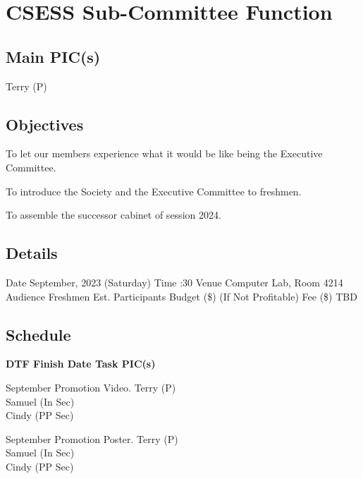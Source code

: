 \section{CSESS Sub-Committee Function}

\subsection{Main PIC(s)}
Terry (P)

\subsection{Objectives}
\startitemize
\item To let our members experience what it would be like being the Executive Committee.
\item To introduce the Society and the Executive Committee to freshmen.
\item To assemble the successor cabinet of session 2024.
\stopitemize

\subsection{Details}
\starttabulate[|rB|l|]
\NC Date
 September, 2023 (Saturday) \NR
\NC Time
:30 \NR
\NC Venue
\NC Computer Lab, Room 4214 \NR
\NC Audience
\NC Freshmen \NR
\NC Est. Participants
 \NR
\NC Budget (\$)
 (If Not Profitable) \NR
\NC Fee (\$)
\NC TBD \NR
\stoptabulate

\subsection{Schedule}

\setupTABLE[c][1][width=0.75in]
\setupTABLE[c][2][width=1in]
\setupTABLE[c][3][width=3in]
\setupTABLE[c][4][width=1.25in]
\bTABLE
\bTABLEhead

\bTR\bTH    \bf{DTF}
\eTH\bTH    \bf{Finish Date}
\eTH\bTH    \bf{Task}
\eTH\bTH    \bf{PIC(s)}
\eTH\eTR

\eTABLEhead
\bTABLEbody

\bTR{}
\eTD{} September
\eTD\bTD Promotion Video.
\eTD\bTD Terry (P) \\ Samuel (In Sec) \\ Cindy (PP Sec)
\eTD\eTR

\bTR{}
\eTD{} September
\eTD\bTD Promotion Poster.
\eTD\bTD Terry (P) \\ Samuel (In Sec) \\ Cindy (PP Sec)
\eTD\eTR

